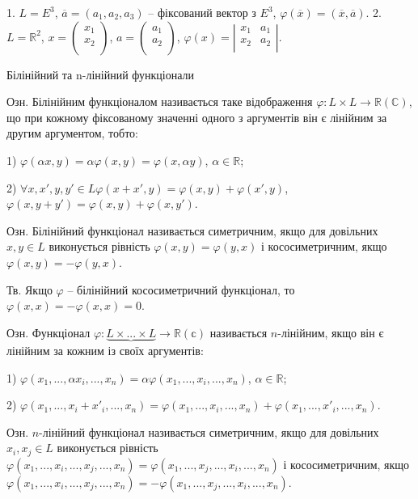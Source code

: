 1. $L = E^3$, $\overline{a} = (a_1, a_2, a_3)$ -- фіксований вектор з $E^3$, $\varphi(\overline{x}) = (\overline{x},\overline{a})$.
2. $L = \mathbb{R}^2$, $x = \begin{pmatrix} x_1 \\ x_2 \\ \end{pmatrix}$, $a = \begin{pmatrix} a_1 \\ a_2 \\ \end{pmatrix}$,
$\varphi(x) = \left|\begin{matrix} x_1 & a_1 \\ x_2 & a_2 \\ \end{matrix}\right|$.


Білінійний та n-лінійний функціонали


Озн. Білінійним функціоналом називається таке відображення
$\varphi: L \times L \rightarrow \mathbb{R} (\mathbb{C})$, що при кожному фіксованому значенні одного з
аргументів він є лінійним за другим аргументом, тобто:

1) $\varphi(\alpha x, y) = \alpha \varphi(x, y) = \varphi(x,\alpha y)$, $\alpha \in \mathbb{R}$;

2) $\forall x, x', y, y' \in L \varphi(x + x',y) = \varphi(x,y) + \varphi(x',y)$,
$\varphi(x,y + y') = \varphi(x,y) + \varphi(x,y')$.


Озн. Білінійний функціонал називається симетричним, якщо для довільних
$x, y \in L$ виконується рівність $\varphi(x,y) = \varphi(y,x)$ і кососиметричним, якщо
$\varphi(x,y) = - \varphi(y,x)$.


Тв. Якщо $\varphi$ -- білінійний кососиметричний функціонал, то
$\varphi(x,x) = - \varphi(x,x) = 0$.


Озн. Функціонал $\varphi: \underbrace{L \times ... \times L} \rightarrow \mathbb{R}(\mathbb{c})$
називається $n$-лінійним, якщо він є
лінійним за кожним із своїх аргументів:

1) $\varphi(x_1, ..., \alpha x_i, ..., x_n) = \alpha \varphi(x_1, ..., x_i, ..., x_n)$, $\alpha \in \mathbb{R}$;

2) $\varphi(x_1, ..., x_i + x'_i, ..., x_n) = \varphi(x_1, ..., x_i, ..., x_n) + \varphi(x_1, ..., x'_i, ..., x_n)$.


Озн. $n$-лінійний функціонал називається симетричним, якщо для довільних
$x_i, x_j \in L$ виконується рівність  $\varphi(x_1, ..., x_i, ..., x_j, ..., x_n) = \varphi(x_1, ..., x_j, ..., x_i, ..., x_n)$
і кососиметричним, якщо $\varphi(x_1, ..., x_i, ..., x_j, ..., x_n) = - \varphi(x_1, ..., x_j, ..., x_i, ..., x_n)$.

